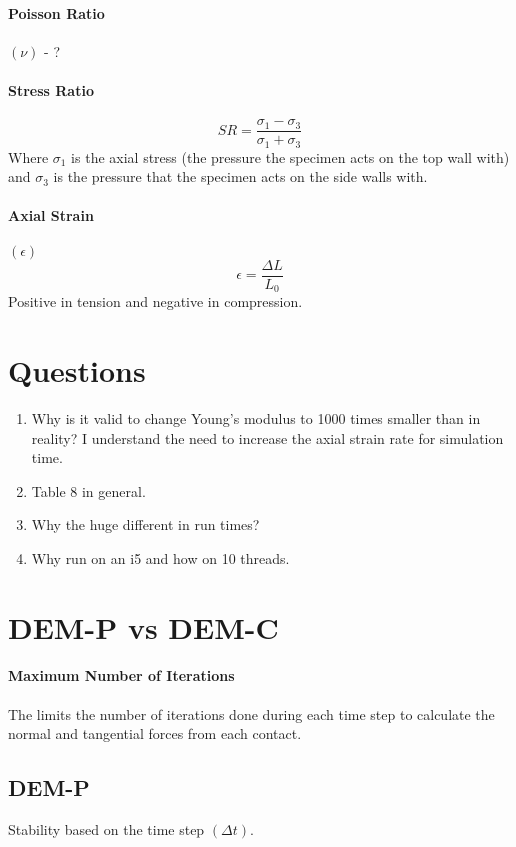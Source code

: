 \documentclass{book}
\begin{document}
\paragraph{Poisson Ratio} $(\nu)$ - ?

\paragraph{Stress Ratio}
\begin{equation}
	SR = \frac{\sigma_1-\sigma_3}{\sigma_1+\sigma_3}
\end{equation}
Where $\sigma_1$ is the axial stress (the pressure the specimen acts on the top wall with) and $\sigma_3$ is the pressure that the specimen acts on the side walls with.
\paragraph{Axial Strain} $(\epsilon)$
\begin{equation}
	\epsilon = \frac{\Delta L}{L_0}
\end{equation}
Positive in tension and negative in compression.
\section{Questions}
\begin{enumerate}
	\item Why is it valid to change Young's modulus to 1000 times smaller than in reality? I understand the need to increase the axial strain rate for simulation time.
	\item Table 8 in general.
	\item Why the huge different in run times?
	\item Why run on an i5 and how on 10 threads.
\end{enumerate}


\section{DEM-P vs DEM-C}
\paragraph{Maximum Number of Iterations} The limits the number of iterations done during each time step to calculate the normal and tangential forces from each contact.
\subsection{DEM-P}
Stability based on the time step $(\Delta t)$.
\end{document}
